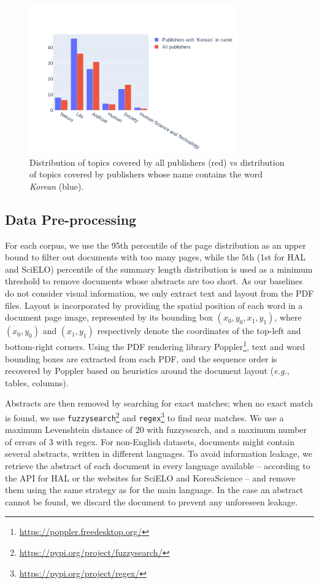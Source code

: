 \begin{figure}[ht]
\centering
    \includegraphics[width=0.8\textwidth]{images/chapter5/koreascience_topic_distr.pdf}
  \caption{Distribution of topics covered by all publishers (red) vs distribution of topics covered by publishers whose name contains the word \textit{Korean} (blue).}
  \label{fig:distr-koreascience-topics}
\end{figure}

\subsection{Data Pre-processing}

For each corpus, we use the 95th percentile of the page distribution as an upper bound to filter out documents with too many pages, while the 5th (1st for HAL and SciELO) percentile of the summary length distribution is used as a minimum threshold to remove documents whose abstracts are too short. As our baselines do not consider visual information, we only extract text and layout from the PDF files. Layout is incorporated by providing the spatial position of each word in a document page image, represented by its bounding box $(x_0, y_0, x_1, y_1)$, where $(x_0, y_0)$ and $(x_1, y_1)$ respectively denote the coordinates of the top-left and bottom-right corners. Using the PDF rendering library Poppler\footnote{ \url{https://poppler.freedesktop.org/}}, text and word bounding boxes are extracted from each PDF, and the sequence order is recovered by Poppler based on heuristics around the document layout (\textit{e.g.}, tables, columns). 

Abstracts are then removed by searching for exact matches; when no exact match is found, we use \texttt{fuzzysearch}\footnote{ \url{https://pypi.org/project/fuzzysearch/}} and \texttt{regex}\footnote{ \url{https://pypi.org/project/regex/}} to find near matches. We use a maximum Levenshtein distance of 20 with fuzzysearch, and a maximum number of errors of 3 with regex. For non-English datasets, documents might contain several abstracts, written in different languages. To avoid information leakage, we retrieve the abstract of each document in every language available -- according to the API for HAL or the websites for SciELO and KoreaScience -- and remove them using the same strategy as for the main language. In the case an abstract cannot be found, we discard the document to prevent any unforeseen leakage. 


